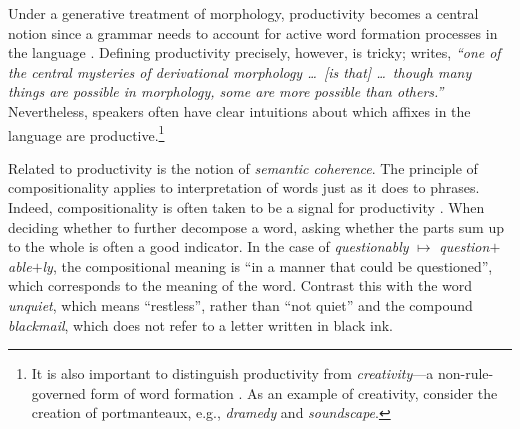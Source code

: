 \documentclass[11pt,letterpaper]{article}
\newcommand{\word}[1]{{\em #1}}
\begin{document}
Under a generative treatment \cite{chomsky2014aspects} of morphology,
productivity becomes a central notion since a grammar needs to account
for active word formation processes in the language
\cite{aronoff1976word}.  Defining productivity precisely, however, is
tricky;  writes, {\em ``one of the central
  mysteries of derivational morphology \ldots\ [is that]
  \ldots\ though many things are possible in morphology, some are more
  possible than others.''}  Nevertheless, speakers often have clear
intuitions about which affixes in the language are productive.\footnote{It is also important to distinguish productivity from {\em
    creativity}---a non-rule-governed form of word
  formation \cite{lyons1977semantics}. As an example of creativity,
  consider the creation of portmanteaux, e.g., \word{dramedy} and \word{soundscape}.}

%
%


Related to productivity is the notion of {\em semantic coherence}.
The principle of compositionality \cite{frege1892,heim1998semantics}
applies to interpretation of words just as it does to phrases. Indeed,
compositionality is often taken to be a  signal
for productivity \cite{aronoff1976word}.  When deciding whether to
further decompose a word, asking whether the parts sum up to the whole
is often a good indicator. In the case of \word{questionably}
$\mapsto$ \word{question}$+$\word{able}$+$\word{ly}, the
compositional meaning is
``in a manner that could be
questioned'', which corresponds to the meaning of the word. Contrast this with the
word \word{unquiet}, which means ``restless'', rather than ``not
quiet'' and the compound \word{blackmail}, which does not refer
to a letter written in black ink.
\end{document}
